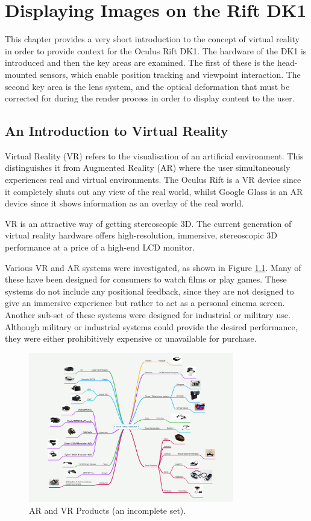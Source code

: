\documentclass[MSc,paper=a4,pagesize=auto]{icldt}
\begin{document}
\chapter{Displaying Images on the Rift DK1}
This chapter provides a very short introduction to the concept of virtual reality in order to provide context for the Oculus Rift DK1. The hardware of the DK1 is introduced and then the key areas are examined. The first of these is the head-mounted sensors, which enable position tracking and viewpoint interaction. The second key area is the lens system, and the optical deformation that must be corrected for during the render process in order to display content to the user. 

\clearpage
\section{An Introduction to Virtual Reality}
Virtual Reality (VR) refers to the visualisation of an artificial environment. This distinguishes it from Augmented Reality (AR) where the user simultaneously experiences real and virtual environments. The Oculus Rift is a VR device since it completely shuts out any view of the real world, whilst Google Glass is an AR device since it shows information as an overlay of the real world.

VR is an attractive way of getting stereoscopic 3D. The current generation of virtual reality hardware offers high-resolution, immersive, stereoscopic 3D performance at a price of a high-end LCD monitor. 

Various VR and AR systems were investigated, as shown in Figure \ref{fig:vr_headsets}. Many of these have been designed for consumers to watch films or play games. These systems do not include any positional feedback, since they are not designed to give an immersive experience but rather to act as a personal cinema screen. Another sub-set of these systems were designed for industrial or military use. Although military or industrial systems could provide the desired performance, they were either prohibitively expensive or unavailable for purchase. 

\begin{figure}[htbp!]
    \centering
    \includegraphics[width=0.8\textwidth]{resources/vr_headsets}
    \caption{AR and VR Products (an incomplete set).}
    \label{fig:vr_headsets}
\end{figure}
\end{document}
